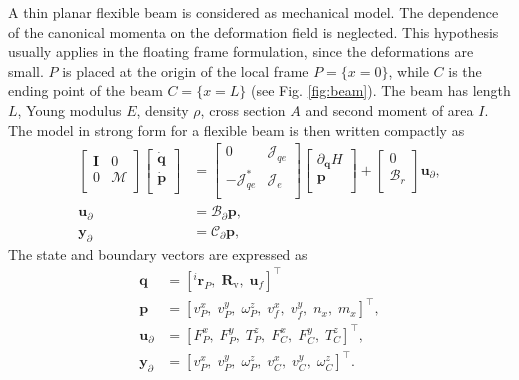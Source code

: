 \documentclass{svjour3}                     %
\begin{document}
	A thin planar flexible beam is considered as mechanical model. The dependence of the canonical momenta on the deformation field is neglected. This hypothesis usually applies in the floating frame formulation, since the deformations are small. $P$ is placed at the origin of the local frame $P=\{x=0\}$, while $C$ is the ending point of the beam $C=\{x=L\}$ (see Fig. \ref{fig:beam}). The beam has length $L$, Young modulus $E$, density $\rho$, cross section $A$ and second moment of area $I$. The model in strong form for a flexible beam is then written compactly as 
	\begin{equation}
	\label{eq:EB_str_phdae}
	\begin{aligned}
	\begin{bmatrix}
	\bm{I} & 0 \\
	0 & \bm{\mathcal{M}} \\
	\end{bmatrix}
	\begin{bmatrix}
	\dot{\bm{q}} \\
	\dot{\bm{p}} \\
	\end{bmatrix}
	&= \begin{bmatrix}
	0 & \bm{\mathcal{J}}_{qe} \\
	-\bm{\mathcal{J}}_{qe}^* & \bm{\mathcal{J}}_e \\
	\end{bmatrix}
	\begin{bmatrix}
	\partial_{\bm{q}} H \\
	\bm{p}  \\
	\end{bmatrix} + 
	\begin{bmatrix}
	0 \\
	\bm{\mathcal{B}}_r \\
	\end{bmatrix} \bm{u}_\partial, \\
	\bm{u}_\partial &= \bm{\mathcal{B}}_{\partial} \bm{p}, \\
	\bm{y}_\partial &= \bm{\mathcal{C}}_{\partial} \bm{p},
	\end{aligned}
	\end{equation}
	The state and boundary vectors are expressed as
	\begin{align*}
	\bm{q} &= [^i\bm{r}_P, \; \bm{R}_{\text{v}}, \; \bm{u}_f]^\top \\
	\bm{p} &= [v_P^x, \; v_P^y, \; \omega_P^z, \; v_f^x, \; v_f^y, \; n_x, \; m_{x}]^\top, \\
	\bm{u}_\partial &=  [F_{P}^x, \; F_{P}^y, \; T_{P}^z, \; F_{C}^x, \; F_{C}^y, \; T_{C}^z]^\top, \\
	\bm{y}_\partial &=  [v_{P}^x, \; v_{P}^y, \; \omega_{P}^z, \; v_{C}^x, \; v_{C}^y, \; \omega_{C}^z]^\top.
	\end{align*}
\end{document}

